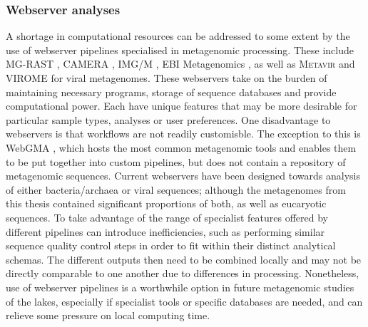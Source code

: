 \subsubsection{Webserver analyses}
A shortage in computational resources can be addressed to some extent by the use of webserver pipelines specialised in metagenomic processing.
These include \acs{MG-RAST} \cite{Meyer2008}, \acs{CAMERA} \cite{Sun2011}, \acs{IMG/M} \cite{Markowitz2008, Markowitz2012}, EBI Metagenomics \cite{Hunter2012}, as well as \textsc{Metavir} \cite{Roux2011} and \acs{VIROME} \cite{Wommack2012} for viral metagenomes.
These webservers take on the burden of maintaining necessary programs, storage of sequence databases and provide computational power.
Each have unique features that may be more desirable for particular sample types, analyses or user preferences.
One disadvantage to webservers is that workflows are not readily customisble.
The exception to this is WebGMA \cite{Wu2011a}, which hosts the most common metagenomic tools and enables them to be put together into custom pipelines, but does not contain a repository of metagenomic sequences.
Current webservers have been designed towards analysis of either bacteria/archaea or viral sequences; although the metagenomes from this thesis contained significant proportions of both, as well as eucaryotic sequences.
To take advantage of the range of specialist features offered by different pipelines can introduce inefficiencies, such as performing similar sequence quality control steps in order to fit within their distinct analytical schemas. 
The different outputs then need to be combined locally and may not be directly comparable to one another due to differences in processing.
Nonetheless, use of webserver pipelines is a worthwhile option in future metagenomic studies of the lakes, especially if specialist tools or specific databases are needed, and can relieve some pressure on local computing time.

